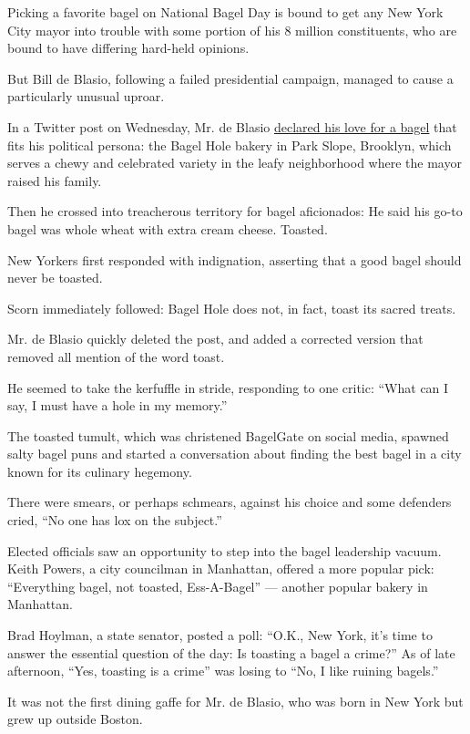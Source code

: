 Picking a favorite bagel on National Bagel Day is bound to get any New
York City mayor into trouble with some portion of his 8 million
constituents, who are bound to have differing hard-held opinions.

But Bill de Blasio, following a failed presidential campaign, managed to
cause a particularly unusual uproar.

In a Twitter post on Wednesday, Mr. de Blasio
\href{https://twitter.com/NYCMayor/status/1217530245672325123}{declared
his love for a bagel} that fits his political persona: the Bagel Hole
bakery in Park Slope, Brooklyn, which serves a chewy and celebrated
variety in the leafy neighborhood where the mayor raised his family.

Then he crossed into treacherous territory for bagel aficionados: He
said his go-to bagel was whole wheat with extra cream cheese. Toasted.

New Yorkers first responded with indignation, asserting that a good
bagel should never be toasted.

Scorn immediately followed: Bagel Hole does not, in fact, toast its
sacred treats.

Mr. de Blasio quickly deleted the post, and added a corrected version
that removed all mention of the word toast.

He seemed to take the kerfuffle in stride, responding to one critic:
``What can I say, I must have a hole in my memory.''

The toasted tumult, which was christened BagelGate on social media,
spawned salty bagel puns and started a conversation about finding the
best bagel in a city known for its culinary hegemony.

There were smears, or perhaps schmears, against his choice and some
defenders cried, ``No one has lox on the subject.''

Elected officials saw an opportunity to step into the bagel leadership
vacuum. Keith Powers, a city councilman in Manhattan, offered a more
popular pick: ``Everything bagel, not toasted, Ess-A-Bagel'' --- another
popular bakery in Manhattan.

Brad Hoylman, a state senator, posted a poll: ``O.K., New York, it's
time to answer the essential question of the day: Is toasting a bagel a
crime?'' As of late afternoon, ``Yes, toasting is a crime'' was losing
to ``No, I like ruining bagels.''

It was not the first dining gaffe for Mr. de Blasio, who was born in New
York but grew up outside Boston.

